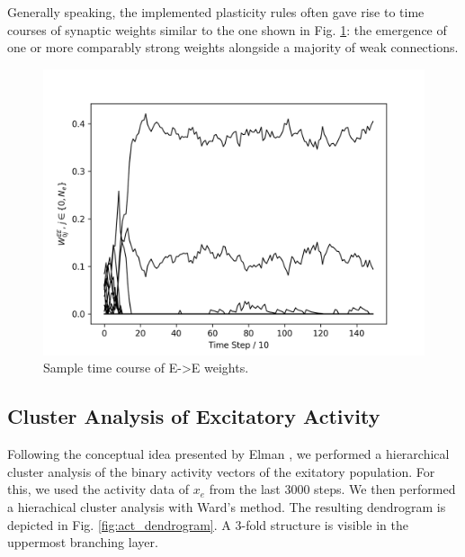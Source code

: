 \documentclass[10pt,a4paper]{article}
\begin{document}
Generally speaking, the implemented plasticity rules often gave rise to time courses of synaptic weights similar to the one shown in Fig. \ref{fig:w_ee_sample_time}: the emergence of one or more comparably strong weights alongside a majority of weak connections.

\begin{figure}
\includegraphics[width=\textwidth]{../../plots/w_ee_sample_time.png}
\caption{\label{fig:w_ee_sample_time} Sample time course of E->E weights.}
\end{figure}

\subsection{Cluster Analysis of Excitatory Activity}

Following the conceptual idea presented by Elman \cite{Elman_1990}, we performed a hierarchical cluster analysis of the binary activity vectors of the exitatory population. For this, we used the activity data of $x_e$ from the last $3000$  steps. We then performed a hierachical cluster analysis with Ward's method. The resulting dendrogram is depicted in Fig. \ref{fig:act_dendrogram}. A 3-fold structure is visible in the uppermost branching layer.
\end{document}
